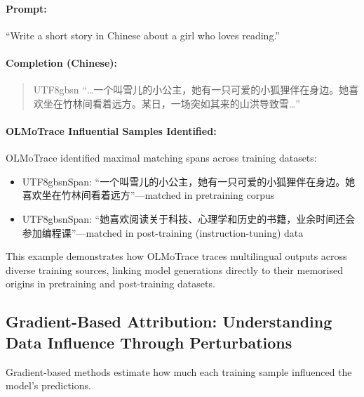 \begin{examplebox}
\label{ex:olmotrace-multilingual}
\paragraph{Prompt:} ``Write a short story in Chinese about a girl who loves reading.''\\

\paragraph{Completion (Chinese):}
\begin{quote}
\begin{CJK*}{UTF8}{gbsn}
``\ldots 一个叫雪儿的小公主，她有一只可爱的小狐狸伴在身边。她喜欢坐在竹林间看着远方。某日，一场突如其来的山洪导致雪\ldots''
\end{CJK*}
\end{quote}

\paragraph{OLMoTrace Influential Samples Identified:}
OLMoTrace identified maximal matching spans across training datasets:
\begin{itemize}
    \item \begin{CJK*}{UTF8}{gbsn}Span: ``一个叫雪儿的小公主，她有一只可爱的小狐狸伴在身边。她喜欢坐在竹林间看着远方''---matched in pretraining corpus\end{CJK*}
    \item \begin{CJK*}{UTF8}{gbsn}Span: ``她喜欢阅读关于科技、心理学和历史的书籍，业余时间还会参加编程课''---matched in post-training (instruction-tuning) data\end{CJK*}
\end{itemize}

This example demonstrates how OLMoTrace traces multilingual outputs across diverse training sources, linking model generations directly to their memorised origins in pretraining and post-training datasets.
\end{examplebox}



\subsection{Gradient-Based Attribution: Understanding Data Influence Through Perturbations}
Gradient-based methods estimate how much each training sample influenced the model's predictions.
  
